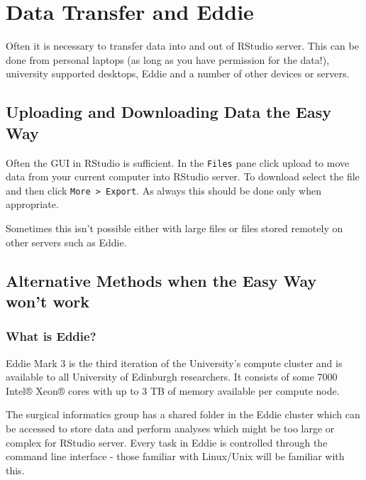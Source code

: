 \documentclass[]{book}
\begin{document}
\hypertarget{data-transfer-and-eddie}{%
\chapter{Data Transfer and Eddie}\label{data-transfer-and-eddie}}

Often it is necessary to transfer data into and out of RStudio server. This can be done from personal laptops (as long as you have permission for the data!), university supported desktops, Eddie and a number of other devices or servers.

\hypertarget{uploading-and-downloading-data-the-easy-way}{%
\section{Uploading and Downloading Data the Easy Way}\label{uploading-and-downloading-data-the-easy-way}}

Often the GUI in RStudio is sufficient. In the \texttt{Files} pane click upload to move data from your current computer into RStudio server. To download select the file and then click \texttt{More\ \textgreater{}\ Export}. As always this should be done only when appropriate.

Sometimes this isn't possible either with large files or files stored remotely on other servers such as Eddie.

\hypertarget{alternative-methods-when-the-easy-way-wont-work}{%
\section{Alternative Methods when the Easy Way won't work}\label{alternative-methods-when-the-easy-way-wont-work}}

\hypertarget{what-is-eddie}{%
\subsection{What is Eddie?}\label{what-is-eddie}}

Eddie Mark 3 is the third iteration of the University's compute cluster and is available to all University of Edinburgh researchers. It consists of some 7000 Intel® Xeon® cores with up to 3 TB of memory available per compute node.

The surgical informatics group has a shared folder in the Eddie cluster which can be accessed to store data and perform analyses which might be too large or complex for RStudio server. Every task in Eddie is controlled through the command line interface - those familiar with Linux/Unix will be familiar with this.
\end{document}

